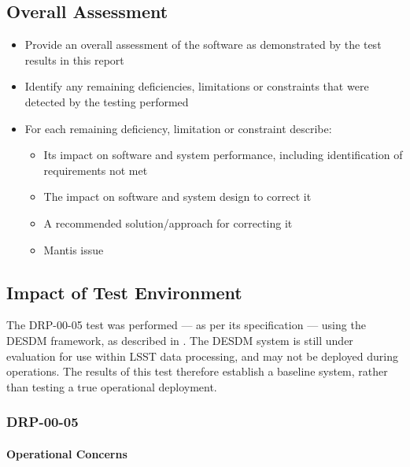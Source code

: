 \documentclass[DM,lsstdraft,STR,toc]{lsstdoc}
\begin{document}
\subsection{Overall Assessment \label{sect:overallassessment}}
\begin{itemize}
\item Provide an overall assessment of the software as demonstrated by the test results in this report
\item Identify any remaining deficiencies, limitations or constraints that were detected by the testing performed
\item For each remaining deficiency, limitation or constraint describe:
\begin{itemize}
\item Its impact on software and system performance, including identification of requirements not met
\item The impact on software and system design to correct it
\item A recommended solution/approach for correcting it
\item Mantis issue
\end{itemize}
\end{itemize}

\subsection{Impact of Test Environment}
\label{sect:impact}

The DRP-00-05 test was performed --- as per its specification --- using the DESDM framework, as described in .
The DESDM system is still under evaluation for use within LSST data processing, and may not be deployed during operations.
The results of this test therefore establish a baseline system, rather than testing a true operational deployment.

\subsubsection{DRP-00-05}

\paragraph{Operational Concerns}
\end{document}
